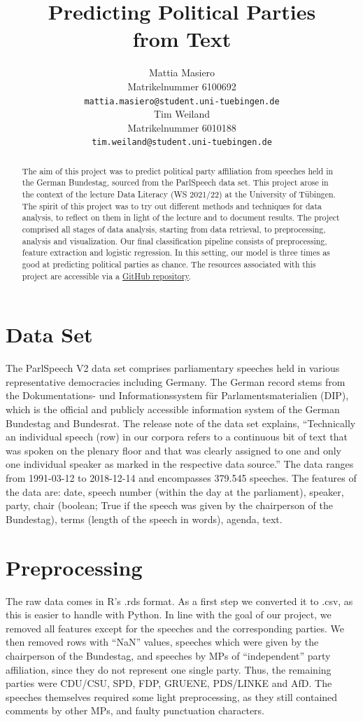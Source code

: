 \documentclass{article}
\title{Predicting Political Parties\\ from Text}
\author{%
  Mattia Masiero\\
  Matrikelnummer 6100692\\
  \texttt{mattia.masiero@student.uni-tuebingen.de} \\
  \And
  Tim Weiland\\
  Matrikelnummer 6010188\\
  \texttt{tim.weiland@student.uni-tuebingen.de} \\
}
\begin{document}
\maketitle

\begin{abstract}
  The aim of this project was to predict political party affiliation from speeches held in the German Bundestag, sourced from the ParlSpeech data set. This project arose in the context of the lecture Data Literacy (WS 2021/22) at the University of Tübingen. The spirit of this project was to try out different methods and techniques for data analysis, to reflect on them in light of the lecture and to document results. The project comprised all stages of data analysis, starting from data retrieval, to preprocessing, analysis and visualization. Our final classification pipeline consists of preprocessing, feature extraction and logistic regression. In this setting, our model is three times as good at predicting political parties as chance. The resources associated with this project are accessible via a \href{https://github.com/timweiland/bundestag_party_prediction}{GitHub repository}.
\end{abstract}

\section{Data Set}
The ParlSpeech V2 data set \cite{DVN/L4OAKN_2020} comprises parliamentary speeches held in various representative democracies including Germany. The German record stems from the Dokumentations- und Informationssystem für Parlamentsmaterialien (DIP), which is the official and publicly accessible information system of the German Bundestag and Bundesrat. The release note of the data set explains, “Technically an individual speech (row) in our corpora refers to a continuous bit of text that was spoken on the plenary floor and that was clearly assigned to one and only one individual speaker as marked in the respective data source.” The data ranges from 1991-03-12 to 2018-12-14 and encompasses 379.545 speeches. The features of the data are: date, speech number (within the day at the parliament), speaker, party, chair (boolean; True if the speech was given by the chairperson of the Bundestag), terms (length of the speech in words), agenda, text.

\section{Preprocessing}
The raw data comes in R’s .rds format. As a first step we converted it to .csv, as this is easier to handle with Python. In line with the goal of our project, we removed all features except for the speeches and the corresponding parties. We then removed rows with “NaN” values, speeches which were given by the chairperson of the Bundestag, and speeches by MPs of “independent” party affiliation, since they do not represent one single party. Thus, the remaining parties were CDU/CSU, SPD, FDP, GRUENE, PDS/LINKE and AfD. The speeches themselves required some light preprocessing, as they still contained comments by other MPs, and faulty punctuation characters.
\end{document}
